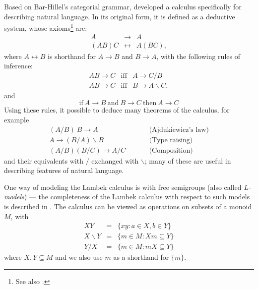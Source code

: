 Based on Bar-Hillel's categorial grammar, \cite{Lambek:58} developed a calculus specifically for describing natural language. In its original form, it is defined as a deductive system, whose axioms\footnote{See also \cite{Wood:93}.} are:
\begin{eqnarray*}
A & \rightarrow & A\\
(AB)C & \leftrightarrow  & A(BC),
\end{eqnarray*}
where $A \leftrightarrow B$ is shorthand for $A\rightarrow B$ and $B\rightarrow A$, with the following rules of inference:
\begin{eqnarray*}
AB \rightarrow C & \mathrm{iff} & A\rightarrow C/B\\
AB \rightarrow C & \mathrm{iff} & B\rightarrow A\backslash C,
\end{eqnarray*}
and
$$\mathrm{if}\ A\rightarrow B\ \mathrm{and}\  B\rightarrow C\ \mathrm{then}\ A\rightarrow C$$
Using these rules, it possible to deduce many theorems of the calculus, for example
$$\begin{aligned}
(A/B)\ B \rightarrow A& &\quad &\text{(Ajdukiewicz's law)}\\
A \rightarrow (B/A)\backslash B & & &\text{(Type raising)}\\
(A/B)(B/C) \rightarrow A/C & & &\text{(Composition)}
\end{aligned}$$
and their equivalents with $/$ exchanged with $\backslash$; many of these are useful in describing features of natural language.

One way of modeling the Lambek calculus is with free semigroups (also called \emph{L-models}) --- the completeness of the Lambek calculus with respect to such models is described in \cite{Pentus:95}. The calculus can be viewed as operations on subsets  of a monoid $M$, with
\begin{eqnarray*}
XY &=& \{xy : a \in X, b \in Y\} \\
X \backslash Y &=& \{m \in M : Xm \subseteq Y\} \\
Y / X &=& \{m \in M : mX \subseteq Y\}
\end{eqnarray*}
where $X,Y\subseteq M$ and we also use $m$ as a shorthand for $\{m\}$.

